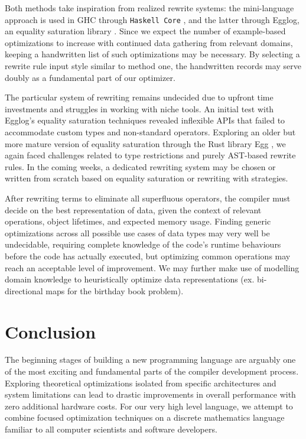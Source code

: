 \documentclass{article}
\begin{document}
Both methods take inspiration from realized rewrite systems: the mini-language approach is used in GHC through \texttt{Haskell Core} \cite{haskellCore}, and the latter through Egglog, an equality saturation library \cite{egglogPython, eggPaper}. Since we expect the number of example-based optimizations to increase with continued data gathering from relevant domains, keeping a handwritten list of such optimizations may be necessary. By selecting a rewrite rule input style similar to method one, the handwritten records may serve doubly as a fundamental part of our optimizer.

The particular system of rewriting remains undecided due to upfront time investments and struggles in working with niche tools. An initial test with Egglog's equality saturation techniques revealed inflexible APIs that failed to accommodate custom types and non-standard operators. Exploring an older but more mature version of equality saturation through the Rust library Egg \cite{eggRust}, we again faced challenges related to type restrictions and purely AST-based rewrite rules. In the coming weeks, a dedicated rewriting system may be chosen or written from scratch based on equality saturation or rewriting with strategies.

After rewriting terms to eliminate all superfluous operators, the compiler must decide on the best representation of data, given the context of relevant operations, object lifetimes, and expected memory usage. Finding generic optimizations across all possible use cases of data types may very well be undecidable, requiring complete knowledge of the code's runtime behaviours before the code has actually executed, but optimizing common operations may reach an acceptable level of improvement. We may further make use of modelling domain knowledge to heuristically optimize data representations (ex. bi-directional maps for the birthday book problem).


\section{Conclusion}
The beginning stages of building a new programming language are arguably one of the most exciting and fundamental parts of the compiler development process. Exploring theoretical optimizations isolated from specific architectures and system limitations can lead to drastic improvements in overall performance with zero additional hardware costs. For our very high level language, we attempt to combine focused optimization techniques on a discrete mathematics language familiar to all computer scientists and software developers.


\pagebreak
\nocite{*} %
\printbibliography %
\end{document}
